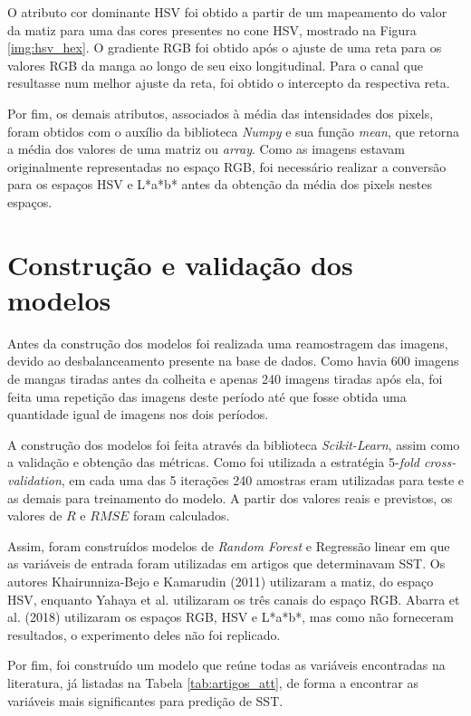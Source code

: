 O atributo cor dominante HSV foi obtido a partir de um mapeamento do valor da matiz para uma das cores presentes no cone HSV, mostrado na Figura \ref{img:hsv_hex}. O gradiente RGB foi obtido após o ajuste de uma reta para os valores RGB da manga ao longo de seu eixo longitudinal. Para o canal que resultasse num melhor ajuste da reta, foi obtido o intercepto da respectiva reta. 

Por fim, os demais atributos, associados à média das intensidades dos pixels, foram obtidos com o auxílio da biblioteca \textit{Numpy} e sua função \textit{mean}, que retorna a média dos valores de uma matriz ou \textit{array}. Como as imagens estavam originalmente representadas no espaço RGB, foi necessário realizar a conversão para os espaços HSV e L*a*b* antes da obtenção da média dos pixels nestes espaços.

\section{Construção e validação dos modelos}

Antes da construção dos modelos foi realizada uma reamostragem das imagens, devido ao desbalanceamento presente na base de dados. Como havia 600 imagens de mangas tiradas antes da colheita e apenas 240 imagens tiradas após ela, foi feita uma repetição das imagens deste período até que fosse obtida uma quantidade igual de imagens nos dois períodos.

A construção dos modelos foi feita através da biblioteca \textit{Scikit-Learn}, assim como a validação e obtenção das métricas. Como foi utilizada a estratégia 5-\textit{fold cross-validation}, em cada uma das 5 iterações 240 amostras eram utilizadas para teste e as demais para treinamento do modelo. A partir dos valores reais e previstos, os valores de $R$ e $RMSE$ foram calculados.

Assim, foram construídos modelos de \textit{Random Forest} e Regressão linear em que as variáveis de entrada foram utilizadas em artigos que determinavam SST. Os autores Khairunniza-Bejo e Kamarudin (2011) utilizaram a matiz, do espaço HSV, enquanto Yahaya et al. utilizaram os três canais do espaço RGB. Abarra et al. (2018) utilizaram os espaços RGB, HSV e L*a*b*, mas como não forneceram resultados, o experimento deles não foi replicado. 

Por fim, foi construído um modelo que reúne todas as variáveis encontradas na literatura, já listadas na Tabela \ref{tab:artigos_att}, de forma a encontrar as variáveis mais significantes para predição de SST.

